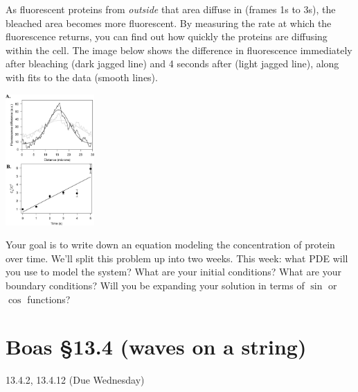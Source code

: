 \documentclass[12pt]{article}
\begin{document}
As fluorescent proteins from \textit{outside} that area diffuse
in (frames 1s to 3s), the bleached area becomes more fluorescent. By
measuring the rate at which the fluorescence returns, you can find out
how quickly the proteins are diffusing within the cell. The image
below shows the difference in fluorescence immediately after bleaching
(dark jagged line) and 4 seconds after (light jagged line), along with
fits to the data (smooth lines).

\includegraphics[trim = 10mm 300mm 00mm 30mm, clip, height=50mm]{F6_large.pdf}

Your goal is to write down an equation modeling the concentration of
protein over time. We'll split this problem up into two weeks. This
week: what PDE will you use to model the system? What are your initial
conditions? What are your boundary conditions? Will you be expanding
your solution in terms of $\sin$ or $\cos$ functions?

\section{Boas \S13.4 (waves on a string)} 
13.4.2, 13.4.12 (Due Wednesday)
\end{document}
